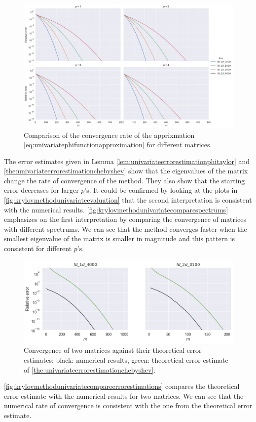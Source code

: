 \begin{figure}[h!]
    \centering
    \includegraphics[width=.9\textwidth]{img/krylovunivariate/compare_fd_1d_n.png}
    \caption{Comparison of the convergence rate of the apprixmation \eqref{eq:univariatephifunctionapproximation} for different matrices.}
    \label{fig:krylovmethodunivariatecomparespectrums}
\end{figure}

The error estimates given in Lemma \ref{lem:univariateerrorestimationphitaylor} and \autoref{the:univariateerrorestimationchebyshev}
show that the eigenvalues of the matrix change the rate of convergence of the method. They also show that the starting error
decreases for larger $p$'s. It could be confirmed by looking at the plots in \autoref{fig:krylovmethodunivariateevaluation} that
the second interpretation is consistent with the numerical results. \autoref{fig:krylovmethodunivariatecomparespectrums} emphasizes
on the first interpretation by comparing the convergence of matrices with different spectrums. We can see that the method converges
faster when the smallest eigenvalue of the matrix is smaller in magnitude and this pattern is consistent for different $p$'s.

\begin{figure}[h!]
    \centering
    \includegraphics[width=.9\textwidth]{img/krylovunivariate/compare_errorbounds.png}
    \caption{
        Convergence of two matrices against their theoretical error estimates;
        black: numerical results,
        green: theoretical error estimate of \autoref{the:univariateerrorestimationchebyshev}.
        }
    \label{fig:krylovmethodunivariatecompareerrorestimations}
\end{figure}

\autoref{fig:krylovmethodunivariatecompareerrorestimations} compares the theoretical error estimate with the numerical
results for two matrices. We can see that the numerical rate of convergence is consistent with the one from the theoretical
error estimate.
